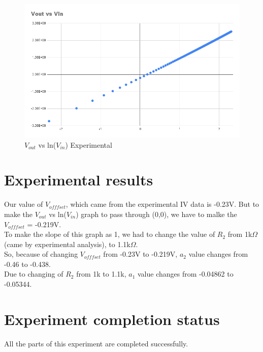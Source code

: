 \documentclass[12pt]{article}
\begin{document}
\begin{figure}[H]
\begin{center}
\includegraphics[scale = 0.6]{Vout vs ln(Vin).png}
\caption{$V_{out}$ vs ln($V_{in}$) Experimental}
\end{center}
\end{figure}




\section{Experimental results}
Our value of $V_{offfset}$, which came from the experimental IV data is -0.23V. But to make the $V_{out}$ vs ln($V_{in}$) graph to pass through (0,0), we have to malke the $V_{offfset}$ = -0.219V. \\
To make the slope of this graph as 1, we had to change the value of $R_2$ from 1k$\Omega $ (came by experimental analysis), to 1.1k$\Omega $. \\
So, because of changing $V_{offfset}$ from -0.23V to -0.219V, $a_2$ value changes from -0.46 to -0.438. \\
Due to changing of $R_2$ from 1k to 1.1k, $a_1$ value changes from -0.04862 to -0.05344. \\



\section{Experiment completion status}
All the parts of this experiment are completed successfully.
\end{document}
